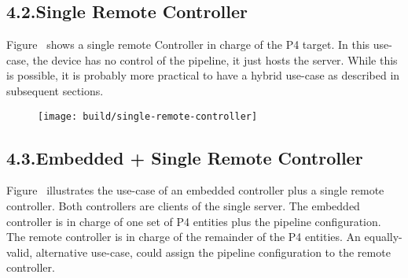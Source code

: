 \documentclass[11pt]{article}
\begin{document}
{%
\subsection{4.2.\hspace*{0.5em}Single Remote Controller}\label{sec-single-remote-controller}%

\noindent{}Figure~ shows a single remote Controller in
charge of the P4 target. In this use-case, the device has no control of the
pipeline, it just hosts the server. While this is possible, it is probably more
practical to have a hybrid use-case as described in subsequent sections.%

\begin{figure}[tbp]%
\begin{mdcenter}%

\noindent{}\texttt{[image: build/single-remote-controller]}{}%

\mdhr{}%

\noindent{}%
\end{mdcenter}\label{fig-single-remote-controller}%
\end{figure}%

\subsection{4.3.\hspace*{0.5em}Embedded + Single Remote Controller}\label{sec-embedded-single-remote-controller}%

\noindent{}Figure~ illustrates the use-case of
an embedded controller plus a single remote controller. Both controllers are
clients of the single server. The embedded controller is in charge of one set of
P4 entities plus the pipeline configuration. The remote controller is in charge
of the remainder of the P4 entities. An equally-valid, alternative use-case,
could assign the pipeline configuration to the remote controller.%

}
\end{document}
